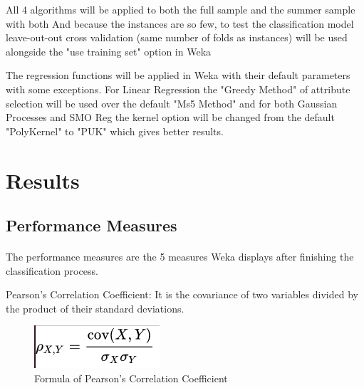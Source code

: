 \documentclass[runningheads]{llncs}
\begin{document}
All 4 algorithms will be applied to both the full sample and the summer sample with both 
And because the instances are so few, to test the classification model leave-out-out cross validation \cite{loo}(same number of folds as instances) will be used alongside the "use training set" option in Weka

The regression functions will be applied in Weka with their default parameters with some exceptions.
For Linear Regression the "Greedy Method" of attribute selection will be used over the default "Ms5 Method" and for both Gaussian Processes and SMO Reg the kernel option will be changed from the default "PolyKernel" to "PUK" which gives better results.


\section{Results}

\subsection{Performance Measures}
\paragraph{}
The performance measures are the 5 measures Weka displays after finishing the classification process.

Pearson's Correlation Coefficient\cite{r}: It is the covariance of two variables divided by the product of their standard deviations.
\begin{figure}[H]
    \caption{Formula of Pearson's Correlation Coefficient}\label{R}
    \centerline{\includegraphics[scale=0.5]{imagens/R.png}}
\end{figure}
\end{document}
